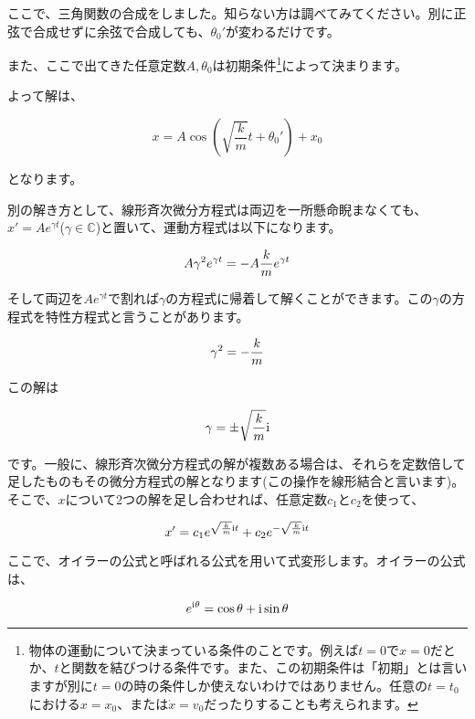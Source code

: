 ここで、三角関数の合成をしました。知らない方は調べてみてください。別に正弦で合成せずに余弦で合成しても、$\theta_0'$が変わるだけです。
\fi

また、ここで出てきた任意定数$A,\theta_0$は初期条件\footnote{物体の運動について決まっている条件のことです。例えば$t=0$で$x=0$だとか、$t$と関数を結びつける条件です。また、この初期条件は「初期」とは言いますが別に$t=0$の時の条件しか使えないわけではありません。任意の$t=t_0$における$x=x_0$、または$\dot{x}=v_0$だったりすることも考えられます。}によって決まります。

よって解は、

\begin{equation}
    x = A\cos\left(\sqrt{\frac{k}{m}}t+\theta_0'\right) + x_0
    \label{eq:vibration}
\end{equation}

となります。


別の解き方として、線形斉次微分方程式は両辺を一所懸命睨まなくても、$x' = Ae^{\gamma t}$($\gamma \in \mathbb{C}$)と置いて、運動方程式は以下になります。

\begin{equation}
    A\gamma^2 e^{\gamma t} = -A\frac{k}{m} e^{\gamma t} \notag
\end{equation}

そして両辺を$Ae^{\gamma t}$で割れば$\gamma$の方程式に帰着して解くことができます。この$\gamma$の方程式を特性方程式と言うことがあります。

\begin{equation}
    \gamma^2  = -\frac{k}{m} \notag
\end{equation}

この解は

\begin{equation}
    \gamma  = \pm \sqrt{\frac{k}{m}} \mathrm{i} \notag
\end{equation}

です。一般に、線形斉次微分方程式の解が複数ある場合は、それらを定数倍して足したものもその微分方程式の解となります(この操作を線形結合と言います)。そこで、$x$について2つの解を足し合わせれば、任意定数$c_1$と$c_2$を使って、

\begin{equation}
   x'  = c_1 e^{ \sqrt{\frac{k}{m}} \mathrm{i}t} + c_2 e^{-\sqrt{\frac{k}{m}} \mathrm{i}t} \notag
\end{equation}

ここで、オイラーの公式と呼ばれる公式を用いて式変形します。オイラーの公式は、

\begin{equation}
    e^{\mathrm{i}\theta} = \cos \theta + \mathrm{i}\sin \theta \notag
\end{equation}

